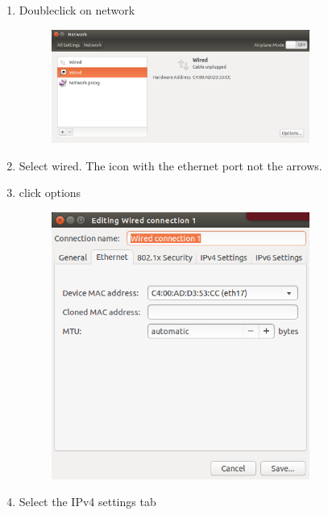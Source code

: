 \documentclass{article}
\begin{document}
\begin{enumerate}
\begin{figure}[H]
\end{figure}
\item Doubleclick on network
\begin{figure}[H]\centering
  \includegraphics[width=0.8\textwidth]{../../Images/networkWired.png}
\end{figure}
\item Select wired. The icon with the ethernet port not the arrows.
\item click options
\begin{figure}[H]\centering
  \includegraphics[width=0.8\textwidth]{../../Images/wireOptionsEthernet.png}
\end{figure}
\item Select the IPv4 settings tab
\begin{figure}[H]\centering

\end{figure}
\end{enumerate}
\end{document}
